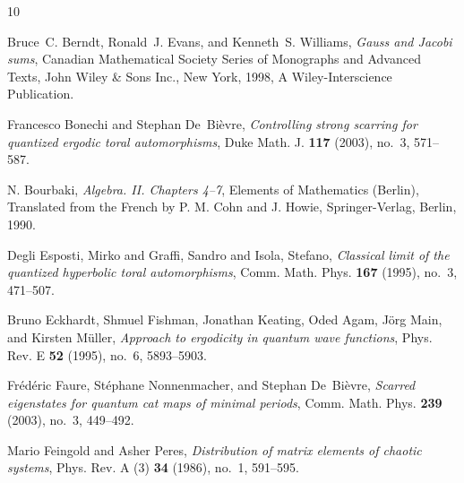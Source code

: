 \documentclass[12pt]{amsart}
\theoremstyle{definition}
\theoremstyle{remark}
\numberwithin{equation}{section}
\begin{document}
\def\cprime{$'$}
\providecommand{\bysame}{\leavevmode\hbox
to3em{\hrulefill}\thinspace}
\providecommand{\MR}{\relax\ifhmode\unskip\space\fi MR }
\providecommand{\MRhref}[2]{%
  \href{http://www.ams.org/mathscinet-getitem?mr=#1}{#2}
} \providecommand{\href}[2]{#2}
\begin{thebibliography}{10}

Bruce~C. Berndt, Ronald~J. Evans, and Kenneth~S. Williams,
\emph{Gauss and
  {J}acobi sums}, Canadian Mathematical Society Series of Monographs and
  Advanced Texts, John Wiley \& Sons Inc., New York, 1998, A Wiley-Interscience
  Publication.



Francesco Bonechi and Stephan De~Bi{\`e}vre, \emph{Controlling
strong scarring
  for quantized ergodic toral automorphisms}, Duke Math. J. \textbf{117}
  (2003), no.~3, 571--587.

 N. Bourbaki, \emph{Algebra. {II}. {C}hapters 4--7},
 Elements of Mathematics (Berlin), Translated from the French by P. M. Cohn and J.
 Howie, Springer-Verlag, Berlin, 1990.


Degli Esposti, Mirko and Graffi, Sandro and Isola, Stefano,
\emph{Classical limit of the quantized hyperbolic toral
automorphisms}, Comm. Math. Phys. \textbf{167} (1995), no.~3,
471--507.

Bruno Eckhardt, Shmuel Fishman, Jonathan Keating, Oded Agam, J\"org
Main, and
  Kirsten M\"uller, \emph{Approach to ergodicity in quantum wave functions},
  Phys. Rev. E \textbf{52} (1995), no.~6, 5893--5903.

Fr{\'e}d{\'e}ric Faure, St{\'e}phane Nonnenmacher, and Stephan
De~Bi{\`e}vre,
  \emph{Scarred eigenstates for quantum cat maps of minimal periods}, Comm.
  Math. Phys. \textbf{239} (2003), no.~3, 449--492.

Mario Feingold and Asher Peres, \emph{Distribution of matrix
elements of
  chaotic systems}, Phys. Rev. A (3) \textbf{34} (1986), no.~1, 591--595.


\end{thebibliography}
\end{document}
